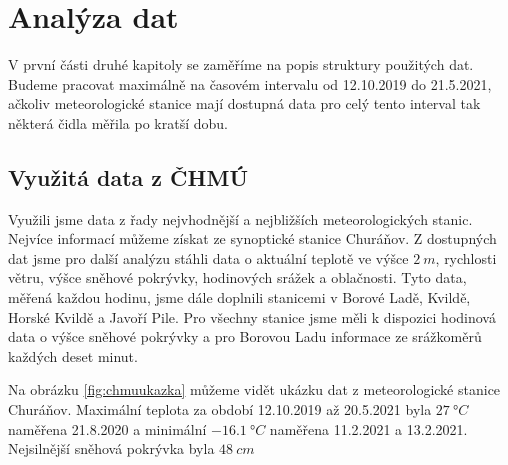 \chapter{Analýza dat} \label{chap:analysis}
V první části druhé kapitoly se zaměříme na popis struktury použitých dat. Budeme pracovat maximálně na časovém intervalu od 12.10.2019 do 21.5.2021, ačkoliv meteorologické stanice mají dostupná data pro celý tento interval tak některá čidla měřila po kratší dobu.

\section{Využitá data z ČHMÚ}
Využili jsme data z řady nejvhodnější a nejbližších meteorologických stanic. Nejvíce informací můžeme získat ze synoptické stanice Churáňov. Z dostupných dat jsme pro další analýzu stáhli data o aktuální teplotě ve výšce $\SI{2}{m}$, rychlosti větru, výšce sněhové pokrývky, hodinových srážek a oblačnosti. Tyto data, měřená každou hodinu, jsme dále doplnili stanicemi v Borové Ladě, Kvildě, Horské Kvildě a Javoří Pile. Pro všechny stanice jsme měli k dispozici hodinová data o výšce sněhové pokrývky a pro Borovou Ladu informace ze srážkoměrů každých deset minut.

Na obrázku \ref{fig:chmuukazka} můžeme vidět ukázku dat z meteorologické stanice Churáňov. Maximální teplota za období 12.10.2019 až 20.5.2021 byla $\SI{27}{\degree C}$ naměřena 21.8.2020 a minimální $\SI{-16.1}{\degree C}$ naměřena 11.2.2021 a 13.2.2021. Nejsilnější sněhová pokrývka byla $\SI{48}{cm}$

